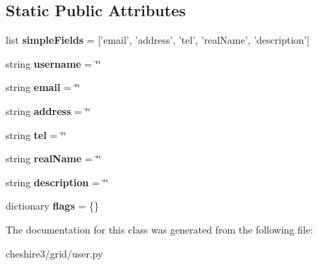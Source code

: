 \subsection*{Static Public Attributes}
\begin{DoxyCompactItemize}
\item 
\hypertarget{classcheshire3_1_1grid_1_1user_1_1_irods_user_ae05aaaad4f3394c401d75d899471cda4}{list {\bfseries simple\-Fields} = \mbox{[}'email', 'address', 'tel', 'real\-Name', 'description'\mbox{]}}\label{classcheshire3_1_1grid_1_1user_1_1_irods_user_ae05aaaad4f3394c401d75d899471cda4}

\item 
\hypertarget{classcheshire3_1_1grid_1_1user_1_1_irods_user_abb59efc8775b66448a986260086ed7cf}{string {\bfseries username} = \char`\"{}\char`\"{}}\label{classcheshire3_1_1grid_1_1user_1_1_irods_user_abb59efc8775b66448a986260086ed7cf}

\item 
\hypertarget{classcheshire3_1_1grid_1_1user_1_1_irods_user_af03d8c6d0b06a508ec155b45975dc267}{string {\bfseries email} = \char`\"{}\char`\"{}}\label{classcheshire3_1_1grid_1_1user_1_1_irods_user_af03d8c6d0b06a508ec155b45975dc267}

\item 
\hypertarget{classcheshire3_1_1grid_1_1user_1_1_irods_user_acc09ae516f3517c4f26add5774396832}{string {\bfseries address} = \char`\"{}\char`\"{}}\label{classcheshire3_1_1grid_1_1user_1_1_irods_user_acc09ae516f3517c4f26add5774396832}

\item 
\hypertarget{classcheshire3_1_1grid_1_1user_1_1_irods_user_a681859347e72ed6f3da75affe4d48dff}{string {\bfseries tel} = \char`\"{}\char`\"{}}\label{classcheshire3_1_1grid_1_1user_1_1_irods_user_a681859347e72ed6f3da75affe4d48dff}

\item 
\hypertarget{classcheshire3_1_1grid_1_1user_1_1_irods_user_a252e826d79aa76f5bb8eb2c2e318dbd9}{string {\bfseries real\-Name} = \char`\"{}\char`\"{}}\label{classcheshire3_1_1grid_1_1user_1_1_irods_user_a252e826d79aa76f5bb8eb2c2e318dbd9}

\item 
\hypertarget{classcheshire3_1_1grid_1_1user_1_1_irods_user_af1b9b8966b61ac8c981a3cc22873319e}{string {\bfseries description} = \char`\"{}\char`\"{}}\label{classcheshire3_1_1grid_1_1user_1_1_irods_user_af1b9b8966b61ac8c981a3cc22873319e}

\item 
\hypertarget{classcheshire3_1_1grid_1_1user_1_1_irods_user_acf745f502727f8a17f205de7cf7948a5}{dictionary {\bfseries flags} = \{\}}\label{classcheshire3_1_1grid_1_1user_1_1_irods_user_acf745f502727f8a17f205de7cf7948a5}

\end{DoxyCompactItemize}


The documentation for this class was generated from the following file\-:\begin{DoxyCompactItemize}
\item 
cheshire3/grid/user.\-py\end{DoxyCompactItemize}
